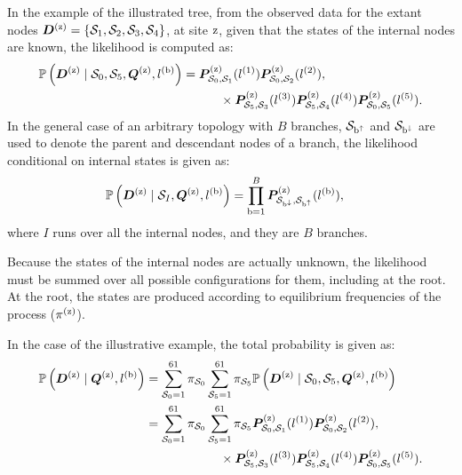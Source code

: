 In the example of the illustrated tree, from the observed data for the extant nodes $\bm{D}^{(\text{z})} = \{ \mathcal{S}_1,\mathcal{S}_2, \mathcal{S}_3, \mathcal{S}_4 \}$, at site $\text{z}$, given that the states of the internal nodes are known, the \gls{likelihood} is computed as:
\begin{align}
    \mathbb{P} \left(\bm{D}^{(\text{z})} \mid \mathcal{S}_0, \mathcal{S}_5, \bm{Q}^{(\text{z})}, l^{(\text{b})} \right) & = \bm{P}^{(\text{z})}_{\mathcal{S}_0, \mathcal{S}_1}(l^{(1)})
    \bm{P}^{(\text{z})}_{\mathcal{S}_0, \mathcal{S}_2}(l^{(2)}), \\
    & \quad \quad \quad
    \times \bm{P}^{(\text{z})}_{\mathcal{S}_5, \mathcal{S}_3}(l^{(3)})
    \bm{P}^{(\text{z})}_{\mathcal{S}_5, \mathcal{S}_4}(l^{(4)})
    \bm{P}^{(\text{z})}_{\mathcal{S}_0, \mathcal{S}_5}(l^{(5)}). \notag
\end{align}
In the general case of an arbitrary topology with $B$ branches, $\mathcal{S}_{\text{b}^{\uparrow}}$ and $\mathcal{S}_{\text{b}^{\downarrow}}$ are used to denote the parent and descendant nodes of a branch, the \gls{likelihood} conditional on internal states is given as:
\begin{align}
    \mathbb{P} \left(\bm{D}^{(\text{z})} \mid \mathcal{S}_{I}, \bm{Q}^{(\text{z})}, l^{(\text{b})} \right) & = \prod\limits_{\text{b}=1}^{B} \bm{P}^{(\text{z})}_{\mathcal{S}_{\text{b}^{\downarrow}}, \mathcal{S}_{\text{b}^{\uparrow}}}(l^{(\text{b})}),
\end{align}
where $I$ runs over all the internal nodes, and they are $B$ branches.

Because the states of the internal nodes are actually unknown, the \gls{likelihood} must be summed over all possible configurations for them, including at the root.
At the root, the states are produced according to equilibrium frequencies of the process ($\pi^{(\text{z})}$).

In the case of the illustrative example, the total probability is given as:
\begin{align}
    \mathbb{P} \left(\bm{D}^{(\text{z})} \mid \bm{Q}^{(\text{z})}, l^{(\text{b})}  \right) & = \sum\limits_{\mathcal{S}_0=1}^{61} \pi_{\mathcal{S}_0} \sum\limits_{\mathcal{S}_5=1}^{61} \pi_{\mathcal{S}_5} \mathbb{P} \left(\bm{D}^{(\text{z})} \mid \mathcal{S}_0, \mathcal{S}_5, \bm{Q}^{(\text{z})}, l^{(\text{b})} \right) \\
    & = \sum\limits_{\mathcal{S}_0=1}^{61} \pi_{\mathcal{S}_0} \sum\limits_{\mathcal{S}_5=1}^{61} \pi_{\mathcal{S}_5} \bm{P}^{(\text{z})}_{\mathcal{S}_0, \mathcal{S}_1}(l^{(1)})
    \bm{P}^{(\text{z})}_{\mathcal{S}_0, \mathcal{S}_2}(l^{(2)}), \\
    & \qquad \qquad \qquad
    \times \bm{P}^{(\text{z})}_{\mathcal{S}_5, \mathcal{S}_3}(l^{(3)})
    \bm{P}^{(\text{z})}_{\mathcal{S}_5, \mathcal{S}_4}(l^{(4)})
    \bm{P}^{(\text{z})}_{\mathcal{S}_0, \mathcal{S}_5}(l^{(5)}).\notag
\end{align}

